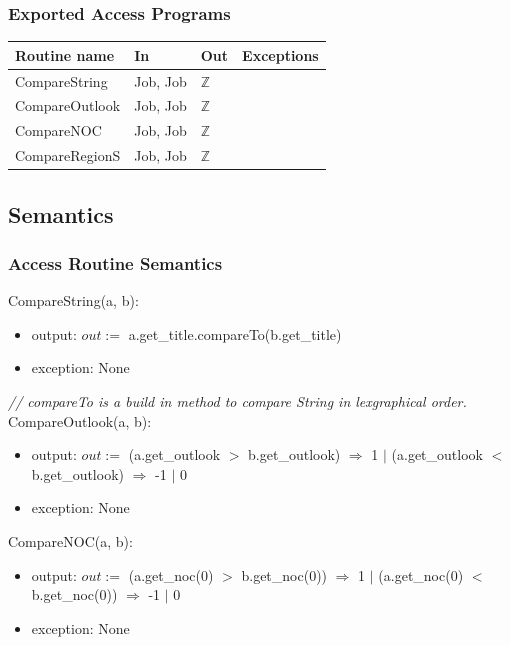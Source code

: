 \documentclass[12pt]{article}
\begin{document}
\subsubsection* {Exported Access Programs}

\begin{tabular}{| l | l | l | p{6cm} |}
\hline
\textbf{Routine name} & \textbf{In} & \textbf{Out} & \textbf{Exceptions}\\
\hline
CompareString & Job, Job & $\mathbb{Z}$ & \\
\hline
CompareOutlook & Job, Job & $\mathbb{Z}$ & \\
\hline
CompareNOC & Job, Job & $\mathbb{Z}$ & \\
\hline
CompareRegionS & Job, Job & $\mathbb{Z}$ & \\
\hline
\end{tabular}

\subsection* {Semantics}

\subsubsection* {Access Routine Semantics}

\noindent CompareString(a, b):
\begin{itemize}
\item output: $out := $ a.get\_title.compareTo(b.get\_title)
\item exception: None
\end{itemize}
\noindent \textit{// compareTo is a build in method to compare String in lexgraphical order.}\\

\noindent CompareOutlook(a, b):
\begin{itemize}
\item output: $out :=$ (a.get\_outlook $>$ b.get\_outlook) $\Rightarrow$ 1 $|$ (a.get\_outlook $<$ b.get\_outlook) $\Rightarrow$ -1 $|$ 0
\item exception: None
\end{itemize}

\noindent CompareNOC(a, b):
\begin{itemize}
\item output: $out :=$ (a.get\_noc(0) $>$ b.get\_noc(0)) $\Rightarrow$ 1 $|$ (a.get\_noc(0) $<$ b.get\_noc(0)) $\Rightarrow$ -1 $|$ 0
\item exception: None
\end{itemize}
\end{document}
